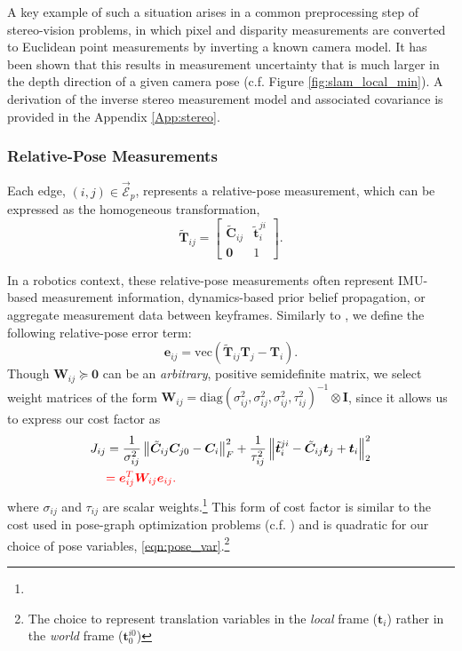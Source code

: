 \documentclass[lettersize,journal]{IEEEtran}
\newcommand{\EdgeSet}{\vec{\bm{\mathcal{E}}}}
\newcommand{\vect}[1]{\mbox{vec}(#1)}
\newcommand{\diag}[1]{\mbox{diag}\left(#1\right)}
\newcommand{\rev}[1]{\color{red}{#1}\color{black}}
\begin{document}
A key example of such a situation arises in a common preprocessing step of stereo-vision problems, in which pixel and disparity measurements are converted to Euclidean point measurements by inverting a known camera model.  It has been shown that this results in measurement uncertainty that is much larger in the depth direction of a given camera pose \cite{matthiesErrorModelingStereo1987,barfootPoseEstimationUsing2011} (c.f. Figure \ref{fig:slam_local_min}). A derivation of the inverse stereo measurement model and associated covariance is provided in the Appendix \ref{App:stereo}. 

\subsubsection{Relative-Pose Measurements}\label{sec:RelPoseMeas}

Each edge, $(i,j) \in \EdgeSet_p $, represents a relative-pose measurement, which can be expressed as the homogeneous transformation,
\begin{equation}
	\tilde{\bm{T}}_{ij} = \begin{bmatrix}
		\tilde{\bm{C}}_{ij} & \tilde{\bm{t}}_i^{ji} \\ \bm{0} & 1
	\end{bmatrix}.
\end{equation}

In a robotics context, these relative-pose measurements often represent IMU-based measurement information, dynamics-based prior belief propagation, or aggregate measurement data between keyframes. Similarly to \cite{brialesCartanSyncFastGlobal2017}, we define the following relative-pose error term:
\begin{equation}\label{eqn:rel_pose_err}
	\bm{e}_{ij} = \vect{\tilde{\bm{T}}_{ij}\bm{T}_j - \bm{T}_i}.
\end{equation}
Though $\bm{W}_{ij} \succeq \bm{0} $ can be an \emph{arbitrary}, positive semidefinite matrix, we select weight matrices of the form $\bm{W}_{ij}=\diag{\sigma^2_{ij},\sigma^2_{ij},\sigma^2_{ij},\tau^2_{ij}}^{-1} \otimes \bm{I}$, since it allows us to express our cost factor as
\begin{align}\label{eqn:rel_pose_cost}
	J_{ij} &= \frac{1}{\sigma^2_{ij}} \left\Vert \tilde{\bm{C}}_{ij}\bm{C}_{j0} - \bm{C}_i\right\Vert_F^2 + \frac{1}{\tau^2_{ij}} \left\Vert \tilde{\bm{t}}^{ji}_{i} - \tilde{\bm{C}}_{ij}\bm{t}_j + \bm{t}_i \right\Vert_2^2 \nonumber\\
	&\rev{= \bm{e}_{ij}^T \bm{W}_{ij} \bm{e}_{ij}.}
\end{align}
where $\sigma_{ij}$ and $\tau_{ij}$ are scalar weights.\footnote{\rev{Note that these weights represent isotropic noise, although representing other distributions may be possible.}} This form of cost factor is similar to the cost used in pose-graph optimization problems (c.f. \cite{brialesCartanSyncFastGlobal2017, rosenSESyncCertifiablyCorrect2019, holmesEfficientGlobalOptimality2023}) and is quadratic for our choice of pose variables, \eqref{eqn:pose_var}.\footnote{The choice to represent translation variables in the \emph{local} frame ($\bm{t}_i$) rather in the \emph{world} frame ($\bm{t}_0^{i0}$) \rev{allows us to keep the cost function quadratic in the variables.}}
\end{document}
